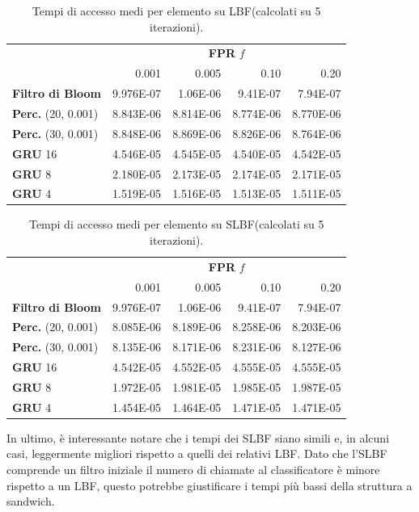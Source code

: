 \documentclass[../../main.tex]{subfiles}
\begin{document}
    \begin{table}[H]
        \centering
        \begin{tabular}{lrrrr}
            \toprule
            & \multicolumn{4}{c}{\textbf{FPR} $f$}\\
            & 0.001 & 0.005 & 0.10 & 0.20\\        
            \midrule
            \textbf{Filtro di Bloom} & 9.976E-07 & 1.06E-06 & 9.41E-07 & 7.94E-07\\
            \midrule
            \textbf{Perc.} (20, 0.001) & 8.843E-06 & 8.814E-06 &  8.774E-06 & 8.770E-06\\
            \textbf{Perc.} (30, 0.001) & 8.848E-06 & 8.869E-06 &  8.826E-06 & 8.764E-06\\
            \textbf{GRU} 16 & 4.546E-05 & 4.545E-05 &  4.540E-05 & 4.542E-05\\
            \textbf{GRU} 8 &  2.180E-05 & 2.173E-05 &  2.174E-05 & 2.171E-05\\
            \textbf{GRU} 4 & 1.519E-05 & 1.516E-05 & 1.513E-05 & 1.511E-05\\
            \bottomrule
        \end{tabular}
        \caption{Tempi di accesso medi per elemento su LBF(calcolati su 5 iterazioni).}
        \label{tab:tempiMediLBF}
    \end{table}

    \begin{table}[H]
        \centering
        \begin{tabular}{lrrrr}
            \toprule
            & \multicolumn{4}{c}{\textbf{FPR} $f$}\\
            & 0.001 & 0.005 & 0.10 & 0.20\\        
            \midrule
            \textbf{Filtro di Bloom} & 9.976E-07 & 1.06E-06 & 9.41E-07 & 7.94E-07\\
            \midrule
            \textbf{Perc.} (20, 0.001) & 8.085E-06 & 8.189E-06 &  8.258E-06 & 8.203E-06\\
            \textbf{Perc.} (30, 0.001) & 8.135E-06 & 8.171E-06 &  8.231E-06 & 8.127E-06\\
            \textbf{GRU} 16 & 4.542E-05 & 4.552E-05 &  4.555E-05 & 4.555E-05\\
            \textbf{GRU} 8 &  1.972E-05 & 1.981E-05 &  1.985E-05 & 1.987E-05\\
            \textbf{GRU} 4 & 1.454E-05 & 1.464E-05 & 1.471E-05 & 1.471E-05\\
            \bottomrule
        \end{tabular}
        \caption{Tempi di accesso medi per elemento su SLBF(calcolati su 5 iterazioni).}
        \label{tab:tempiMediSLBF}
    \end{table}

    In ultimo, è interessante notare che i tempi dei SLBF siano simili e, in alcuni casi, leggermente migliori rispetto a quelli dei relativi LBF. Dato che l'SLBF comprende un filtro iniziale il numero di chiamate al classificatore è minore rispetto a un LBF, questo potrebbe giustificare i tempi più bassi della struttura a sandwich.
\end{document}
